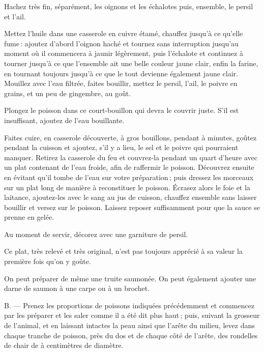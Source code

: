 Hachez très fin, séparément, les oignons et les échalotes puis, ensemble, le
persil et l'ail.

Mettez l'huile dans une casserole en cuivre étamé, chauffez jusqu'à ce qu'elle
fume : ajoutez d'abord l'oignon haché et tournez sans interruption jusqu'au
moment où il commencera à jaunir légèrement, puis l’échalote et continuez
à tourner jusqu'à ce que l'ensemble ait une belle couleur jaune clair, enfin la
farine, en tournant toujours jusqu'à ce que le tout devienne également jaune
clair. Mouillez avec l'eau filtrée, faites bouillir, mettez le persil, l'ail,
le poivre en grains, et un peu de gingembre, au goût.

Plongez le poisson dans ce court-bouillon qui devra le couvrir juste. S'il est
insuffisant, ajoutez de l'eau bouillante.

Faites cuire, en casserole découverte, à gros bouillons, pendant {\mmm}
à {\mmm} minutes, goûtez pendant la cuisson et ajoutez, s'il y a lieu, le
sel et le poivre qui pourraient manquer. Retirez la casserole du feu et
couvrez-la pendant un quart d'heure avec un plat contenant de l'eau froide,
afin de raffermir le poisson. Découvrez ensuite en évitant qu'il tombe de l'eau
sur votre préparation ; puis dressez les morceaux sur un plat long de manière
à reconstituer le poisson. Écrasez alors le foie et la laitance, ajoutez-les
avec le sang au jus de cuisson, chauffez ensemble sans laisser bouillir et
versez sur le poisson. Laissez reposer suffisamment pour que la sauce se prenne
en gelée.

Au moment de servir, décorez avec une garniture de persil.

Ce plat, très relevé et très original, n’est pas toujours apprécié à sa valeur
la première fois qu'on y goûte.

\sk

On peut préparer de même une truite saumonée.
On peut également ajouter une darne de saumon à une carpe ou à un brochet.

\sk

B. — Prenez les proportions de poissons indiquées précédemment et commencez par
les préparer et les saler comme il a été dit plus haut ; puis, suivant la
grosseur de l'animal, et en laissant intactes la peau ainsi que l'arête du
milieu, levez dans chaque tranche de poisson, près du dos et de chaque côté de
l’arête, des rondelles de chair de {\mmm} à {\mmm} centimètres de
diamètre.

